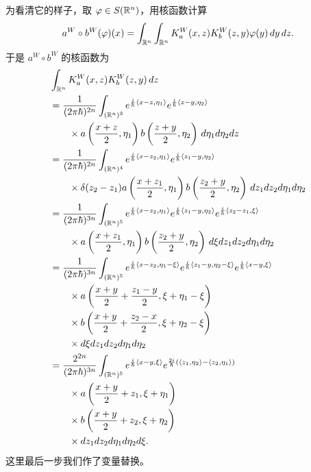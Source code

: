 为看清它的样子，取 \(\varphi\in S(\mathbb{R}^n)\)，用核函数计算
\[
  a^W\circ b^W(\varphi)(x)
  =\int_{\mathbb{R}^n}\int_{\mathbb{R}^n}K_a^W(x,z)K_b^W(z,y)\varphi(y)\,dy\,dz.
\]
于是 \(a^W\circ b^W\) 的核函数为
\begin{align*}
  &\int_{\mathbb{R}^n}K_a^W(x,z)K_b^W(z,y)\,dz\\
  &=\frac{1}{(2\pi\hbar)^{2n}}\int_{(\mathbb{R}^n)^3}
    e^{\frac{i}{\hbar}\langle x-z,\eta_1\rangle}
    e^{\frac{i}{\hbar}\langle z-y,\eta_2\rangle}\\
  &\qquad\times
    a\left(\frac{x+z}{2},\eta_1\right)b\left(\frac{z+y}{2},\eta_2\right)
    \,d\eta_1d\eta_2dz\\
  &=\frac{1}{(2\pi\hbar)^{2n}}\int_{(\mathbb{R}^n)^4}
    e^{\frac{i}{\hbar}\langle x-z_2,\eta_1\rangle}
    e^{\frac{i}{\hbar}\langle z_1-y,\eta_2\rangle}\\
  &\qquad\times\delta(z_2-z_1)
    a\left(\frac{x+z_1}{2},\eta_1\right)b\left(\frac{z_2+y}{2},\eta_2\right)
    \,dz_1dz_2d\eta_1d\eta_2\\
  &=\frac{1}{(2\pi\hbar)^{3n}}\int_{(\mathbb{R}^n)^5}
    e^{\frac{i}{\hbar}\langle x-z_2,\eta_1\rangle}
    e^{\frac{i}{\hbar}\langle z_1-y,\eta_2\rangle}
    e^{\frac{i}{\hbar}\langle z_2-z_1,\xi\rangle}\\
  &\qquad\times
    a\left(\frac{x+z_1}{2},\eta_1\right)b\left(\frac{z_2+y}{2},\eta_2\right)
    \,d\xi dz_1dz_2d\eta_1d\eta_2\\
  &=\frac{1}{(2\pi\hbar)^{3n}}\int_{(\mathbb{R}^n)^5}
    e^{\frac{i}{\hbar}\langle x-z_2,\eta_1-\xi\rangle}
    e^{\frac{i}{\hbar}\langle z_1-y,\eta_2-\xi\rangle}
    e^{\frac{i}{\hbar}\langle x-y,\xi\rangle}\\
  &\qquad\times
    a\left(\frac{x+y}{2}+\frac{z_1-y}{2},\xi+\eta_1-\xi\right)\\
  &\qquad\times
    b\left(\frac{x+y}{2}+\frac{z_2-x}{2},\xi+\eta_2-\xi\right)\\
  &\qquad\times d\xi dz_1dz_2d\eta_1d\eta_2\\
  &=\frac{2^{2n}}{(2\pi\hbar)^{3n}}\int_{(\mathbb{R}^n)^5}
    e^{\frac{i}{\hbar}\langle x-y,\xi\rangle}
    e^{\frac{2i}{\hbar}\left(\langle z_1,\eta_2\rangle-\langle z_2,\eta_1\rangle\right)}\\
  &\qquad\times
    a\left(\frac{x+y}{2}+z_1,\xi+\eta_1\right)\\
  &\qquad\times
    b\left(\frac{x+y}{2}+z_2,\xi+\eta_2\right)\\
  &\qquad\times dz_1dz_2d\eta_1d\eta_2d\xi.
\end{align*}
这里最后一步我们作了变量替换。

